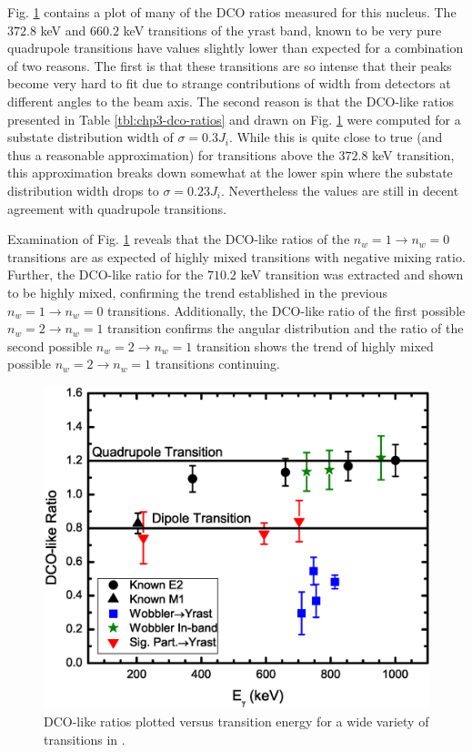 Fig. \ref{fig:chp4-dco} contains a plot of many of the DCO ratios measured for this nucleus. The $372.8$ keV and $660.2$ keV transitions of the yrast band, known to be very pure quadrupole transitions have values slightly lower than expected for a combination of two reasons. The first is that these transitions are so intense that their peaks become very hard to fit due to strange contributions of width from detectors at different angles to the beam axis. The second reason is that the DCO-like ratios presented in Table \ref{tbl:chp3-dco-ratios} and drawn on Fig. \ref{fig:chp4-dco} were computed for a substate distribution width of $\sigma{}=0.3J_i$. While this is quite close to true (and thus a reasonable approximation) for transitions above the $372.8$ keV transition, this approximation breaks down somewhat at the lower spin where the substate distribution width drops to $\sigma{}=0.23J_i$. Nevertheless the values are still in decent agreement with quadrupole transitions.

Examination of Fig. \ref{fig:chp4-dco} reveals that the DCO-like ratios of the $n_w=1\rightarrow{}n_w=0$ transitions are as expected of highly mixed transitions with negative mixing ratio. Further, the DCO-like ratio for the $710.2$ keV transition was extracted and shown to be highly mixed, confirming the trend established in the previous $n_w=1\rightarrow{}n_w=0$ transitions. Additionally, the DCO-like ratio of the first possible $n_w=2\rightarrow{}n_w=1$ transition confirms the angular distribution and the ratio of the second possible $n_w=2\rightarrow{}n_w=1$ transition shows the trend of highly mixed possible $n_w=2\rightarrow{}n_w=1$ transitions continuing.

\begin{figure}[t!]
\centerline{\includegraphics[width=\textwidth]{./img/c4/DCO.eps}}
	\caption{DCO-like ratios plotted versus transition energy for a wide variety of transitions in \pr{}.\label{fig:chp4-dco}}
\end{figure}

